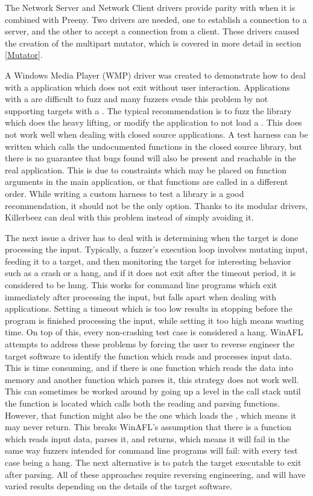The Network Server and Network Client drivers provide parity with \AFL{} when it
is combined with Preeny.\cite{preeny}  Two drivers are needed, one to establish
a connection to a server, and the other to accept a connection from a
client. These drivers caused the creation of the multipart mutator,
which is covered in more detail in section \ref{Mutator}.

A Windows Media Player (WMP) driver was created to demonstrate how to deal with
a \GUI{} application which does not exit without user interaction. Applications
with a \GUI{} are difficult to fuzz and many fuzzers evade this problem by not
supporting targets with a \GUI{}.  The typical recommendation is to fuzz the library
which does the heavy lifting, or modify the application to not load a \GUI{}.
This does not work well when dealing with closed source applications. A test
harness can be written which calls the undocumented functions in the closed
source library, but there is no guarantee that bugs found will also be present
and reachable in the real application.  This is due to constraints which may
be placed on function arguments in the main application, or that functions are
called in a different order.  While writing a custom harness to test a library
is a good recommendation, it should not be the only option. Thanks to its
modular drivers, Killerbeez can deal with this problem instead of simply avoiding it.

The next issue a driver has to deal with is determining when the target is done
processing the input.
Typically, a fuzzer's execution loop involves mutating input, feeding it to a
target, and then monitoring the target for interesting behavior such as a crash
or a hang, and if it does not exit after the timeout period, it is considered to
be hung.  This works for command line programs which exit immediately after processing
the input, but falls apart when dealing with \GUI{} applications.
Setting a timeout which is too low results in stopping before the
program is finished processing the input, while setting it too high means
wasting time. On top of this, every non-crashing test case is considered
a hang. WinAFL attempts to address these problems by forcing the user to
reverse engineer the target software to identify the function which reads and
processes input data.  This is time consuming, and if there is one function
which reads the data into memory and another function which parses it, this
strategy does not work well. This can sometimes be worked around by going up
a level in the call stack until the function is located which calls both the reading and parsing functions.
However, that function might also be the one which loads the \GUI{}, which means
it may never return. This breaks WinAFL's assumption that there is a function
which reads input data, parses it, and returns, which means it will fail in the
same way fuzzers intended for command line programs will fail: with every test
case being a hang.  The next alternative is to patch the target executable
to exit after parsing. All of these approaches require reversing engineering,
and will have varied results depending on the details of the target software.

